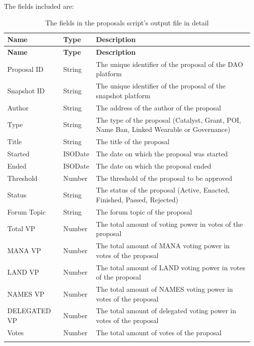 \documentclass[MSE,Master,english]{twbook}%
\begin{document}
The fields included are:
\begin{xltabular}{\textwidth}{|l|l|X|}
  \hline
  \textbf{Name} & \textbf{Type} & \textbf{Description}                         \\ \hline
  \endfirsthead
  \hline
  \textbf{Name} & \textbf{Type} & \textbf{Description}                         \\ \hline
  \endhead
  Proposal ID   & String        & The unique identifier of the proposal of the \gls{DAO} platform                        \\ \hline
  Snapshot ID  & String & The unique identifier of the proposal of the snapshot platform                           \\ \hline
  Author        & String        & The address of the author of the proposal                                        \\ \hline
  Type         & String & The type of the proposal (Catalyst, Grant, POI, Name Ban, Linked Wearable or Governance) \\ \hline
  Title         & String        & The title of the proposal                                                        \\ \hline
  Started       & ISODate       & The date on which the proposal was started                                       \\ \hline
  Ended         & ISODate       & The date on which the proposal ended                                             \\ \hline
  Threshold     & Number        & The threshold of the proposal to be approved                                     \\ \hline
  Status       & String & The status of the proposal (Active, Enacted, Finished, Passed, Rejected)                 \\ \hline
  Forum Topic   & String        & The forum topic of the proposal                                                  \\ \hline
  Total VP      & Number        & The total amount of voting power in votes of the proposal                        \\ \hline
  \gls{MANA} VP       & Number        & The total amount of \gls{MANA} voting power in votes of the proposal                   \\ \hline
  \gls{LAND} VP       & Number        & The total amount of \gls{LAND} voting power in votes of the proposal                   \\ \hline
  NAMES VP      & Number        & The total amount of NAMES voting power in votes of the proposal                  \\ \hline
  DELEGATED VP & Number & The total amount of delegated voting power in votes of the proposal                      \\ \hline
  Votes         & Number        & The total amount of votes of the proposal                                        \\ \hline
  \caption{The fields in the proposals script's output file in detail}
  \label{table:proposals}
\end{xltabular}
\end{document}
